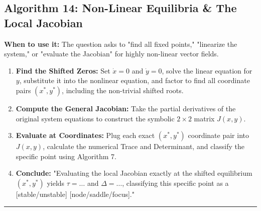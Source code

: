 \documentclass[11pt, a4paper]{report}
\begin{document}
\subsection*{Algorithm 14: Non-Linear Equilibria \& The Local Jacobian}
\textbf{When to use it:} The question asks to "find all fixed points," "linearize the system," or "evaluate the Jacobian" for highly non-linear vector fields.
\begin{enumerate}[label=\textbf{\arabic*.}]
    \item \textbf{Find the Shifted Zeros:} Set $\dot{x} = 0$ and $\dot{y} = 0$, solve the linear equation for $y$, substitute it into the nonlinear equation, and factor to find all coordinate pairs $(x^*, y^*)$, including the non-trivial shifted roots.
    \item \textbf{Compute the General Jacobian:} Take the partial derivatives of the original system equations to construct the symbolic $2 \times 2$ matrix $J(x,y)$.
    \item \textbf{Evaluate at Coordinates:} Plug each exact $(x^*, y^*)$ coordinate pair into $J(x,y)$, calculate the numerical Trace and Determinant, and classify the specific point using Algorithm 7.
    \item \textbf{Conclude:} "Evaluating the local Jacobian exactly at the shifted equilibrium $(x^*, y^*)$ yields $\tau = \dots$ and $\Delta = \dots$, classifying this specific point as a [stable/unstable] [node/saddle/focus]."
\end{enumerate}
\vspace{1em}
\noindent\rule{\textwidth}{0.4pt}
\vspace{1em}
\end{document}

